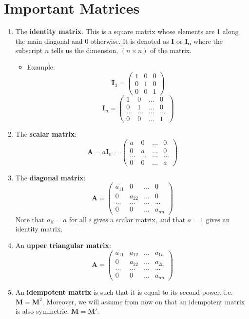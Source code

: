 \documentclass[11pt]{article}
\theoremstyle{definition}
\theoremstyle{remark}
\begin{document}
\section{Important Matrices}
\begin{enumerate}
\item The \textbf{identity matrix}. This is a square matrix whose elements are 1 along the main diagonal and 0 otherwise. It is denoted as \textbf{I} or $\mathbf{I_n}$ where the subscript $n$ tells us the dimension, $(n \times n)$ of the matrix.
\begin{itemize}
\item Example: 
$$
\textbf{I}_{3} =
\begin{pmatrix}
1&0&0\\
0&1&0\\
0&0&1\end{pmatrix}
$$
$$
\textbf{I}_{n} =
\begin{pmatrix}
1&0&...&0\\
0&1&...&0\\
...&...&...&...\\
0&0&...&1\end{pmatrix}
$$
\end{itemize}
\item The \textbf{scalar matrix}:
$$
\textbf{A} = a\textbf{I}_{n} =
\begin{pmatrix}
a&0&...&0\\
0&a&...&0\\
...&...&...&...\\
0&0&...&a\end{pmatrix}
$$
\item The \textbf{diagonal matrix}:
$$
\textbf{A} =
\begin{pmatrix}
a_{11}&0&...&0\\
0&a_{22}&...&0\\
...&...&...&...\\
0&0&...&a_{nn}\end{pmatrix}
$$
Note that $a_{ii} = a$ for all $i$ gives a scalar matrix, and that $a = 1$ gives an identity matrix.
\item An \textbf{upper triangular matrix}:
$$
\textbf{A} =
\begin{pmatrix}
a_{11}&a_{12}&...&a_{1n}\\
0&a_{22}&...&a_{2n}\\
...&...&...&...\\
0&0&...&a_{nn}\end{pmatrix}
$$
\item An \textbf{idempotent matrix} is such that it is equal to its second power, i.e. $\mathbf{M}=\mathbf{M}^2$. Moreover, we will assume from now on that an idempotent matrix is also symmetric, $\mathbf{M} =\mathbf{M'}$.
\end{enumerate}
\end{document}
